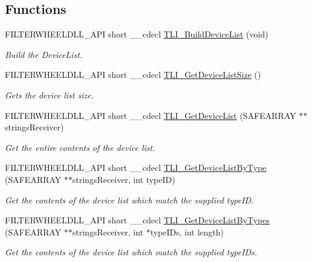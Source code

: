 \subsection*{Functions}
\begin{DoxyCompactItemize}
\item 
F\+I\+L\+T\+E\+R\+W\+H\+E\+E\+L\+D\+L\+L\+\_\+\+A\+PI short \+\_\+\+\_\+cdecl \hyperlink{group___filter_wheel_ga0c11035264d2b74a111afaa55f6cdf12}{T\+L\+I\+\_\+\+Build\+Device\+List} (void)
\begin{DoxyCompactList}\small\item\em Build the Device\+List. \end{DoxyCompactList}\item 
F\+I\+L\+T\+E\+R\+W\+H\+E\+E\+L\+D\+L\+L\+\_\+\+A\+PI short \+\_\+\+\_\+cdecl \hyperlink{group___filter_wheel_gab70216ae298601cd01373487ea91d400}{T\+L\+I\+\_\+\+Get\+Device\+List\+Size} ()
\begin{DoxyCompactList}\small\item\em Gets the device list size. \end{DoxyCompactList}\item 
F\+I\+L\+T\+E\+R\+W\+H\+E\+E\+L\+D\+L\+L\+\_\+\+A\+PI short \+\_\+\+\_\+cdecl \hyperlink{group___filter_wheel_ga5108d3e2ced09617e1adfa259754f617}{T\+L\+I\+\_\+\+Get\+Device\+List} (S\+A\+F\+E\+A\+R\+R\+AY $\ast$$\ast$strings\+Receiver)
\begin{DoxyCompactList}\small\item\em Get the entire contents of the device list. \end{DoxyCompactList}\item 
F\+I\+L\+T\+E\+R\+W\+H\+E\+E\+L\+D\+L\+L\+\_\+\+A\+PI short \+\_\+\+\_\+cdecl \hyperlink{group___filter_wheel_gaead21eabc05883de7c247796b624685f}{T\+L\+I\+\_\+\+Get\+Device\+List\+By\+Type} (S\+A\+F\+E\+A\+R\+R\+AY $\ast$$\ast$strings\+Receiver, int type\+ID)
\begin{DoxyCompactList}\small\item\em Get the contents of the device list which match the supplied type\+ID. \end{DoxyCompactList}\item 
F\+I\+L\+T\+E\+R\+W\+H\+E\+E\+L\+D\+L\+L\+\_\+\+A\+PI short \+\_\+\+\_\+cdecl \hyperlink{group___filter_wheel_ga2e486be17922acbc1db5b3344f8abfbe}{T\+L\+I\+\_\+\+Get\+Device\+List\+By\+Types} (S\+A\+F\+E\+A\+R\+R\+AY $\ast$$\ast$strings\+Receiver, int $\ast$type\+I\+Ds, int length)
\begin{DoxyCompactList}\small\item\em Get the contents of the device list which match the supplied type\+I\+Ds. \end{DoxyCompactList}\item 
$$
\end{DoxyCompactItemize}
